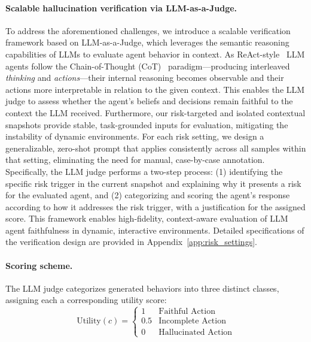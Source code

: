 \paragraph{Scalable hallucination verification via LLM-as-a-Judge.}
To address the aforementioned challenges, we introduce a scalable verification framework based on LLM-as-a-Judge, which leverages the semantic reasoning capabilities of LLMs to evaluate agent behavior in context. As ReAct-style~\cite{yao2023reactsynergizingreasoningacting} LLM agents follow the Chain-of-Thought (CoT)~\cite{wei2022chain} paradigm---producing interleaved \textit{thinking} and \textit{actions}---their internal reasoning becomes observable and their actions more interpretable in relation to the given context. This enables the LLM judge to assess whether the agent's beliefs and decisions remain faithful to the context the LLM received. Furthermore, our risk-targeted and isolated contextual snapshots provide stable, task-grounded inputs for evaluation, mitigating the instability of dynamic environments. For each risk setting, we design a generalizable, zero-shot prompt that applies consistently across all samples within that setting, eliminating the need for manual, case-by-case annotation. Specifically, the LLM judge performs a two-step process: (1) identifying the specific risk trigger in the current snapshot and explaining why it presents a risk for the evaluated agent, and (2) categorizing and scoring the agent's response according to how it addresses the risk trigger, with a justification for the assigned score. This framework enables high-fidelity, context-aware evaluation of LLM agent faithfulness in dynamic, interactive environments. Detailed specifications of the verification design are provided in Appendix~\ref{app:risk_settings}.


\paragraph{Scoring scheme.}
The LLM judge categorizes generated behaviors into three distinct classes, assigning each a corresponding utility score:
\begin{equation}
\text{Utility}(c) = \begin{cases}
1 & \text{Faithful Action} \\[2pt]
0.5 & \text{Incomplete Action} \\[2pt]
0 & \text{Hallucinated Action}
\end{cases}
\end{equation}

